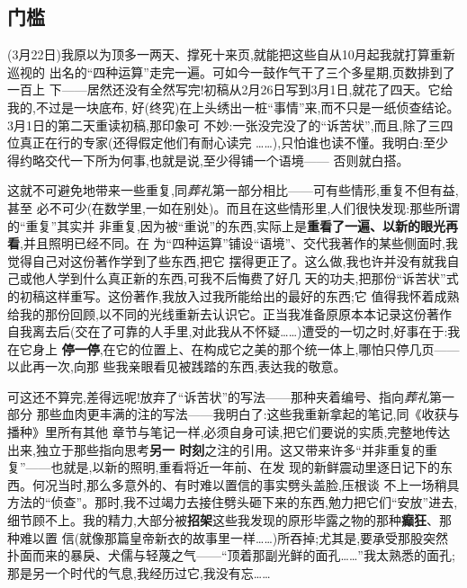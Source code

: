 \subsection{门槛}   %


\pmark{}(3月22日)我原以为顶多一两天、撑死十来页,就能把这些自从10月起我就打算重新巡视的
出名的“四种运算”走完一遍。可如今一鼓作气干了三个多星期,页数排到了一百上
下——居然还没有全然写完!初稿从2月26日写到3月1日,就花了四天。它给我的,不过是一块底布,
好(终究)在上头绣出一桩“事情”来,而不只是一纸侦查结论。3月1日的第二天重读初稿,那印象可
不妙:一张没完没了的“诉苦状”,而且,除了三四位真正在行的专家(还得假定他们有耐心读完
……),只怕谁也读不懂。我明白:至少得约略交代一下所为何事,也就是说,至少得铺一个语境——
否则就白搭。

这就不可避免地带来一些重复,同\emph{葬礼}第一部分相比——可有些情形,重复不但有益,甚至
必不可少(在数学里,一如在别处)。而且在这些情形里,人们很快发现:那些所谓的“重复”其实并
非重复,因为被“重说”的东西,实际上是\textbf{重看了一遍、以新的眼光再看},并且照明已经不同。在
为“四种运算”铺设“语境”、交代我著作的某些侧面时,我觉得自己对这份著作学到了些东西,把它
摆得更正了。这么做,我也许并没有就我自己或他人学到什么真正新的东西,可我不后悔费了好几
天的功夫,把那份“诉苦状”式的初稿这样重写。这份著作,我放入过我所能给出的最好的东西;它
值得我怀着成熟给我的那份回顾,以不同的光线重新去认识它。正当我准备原原本本记录这份著作
自我离去后(交在了可靠的人手里,对此我从不怀疑……)遭受的一切之时,好事在于:我在它身上
\textbf{停一停},在它的位置上、在构成它之美的那个统一体上,哪怕只停几页——以此再一次,向那
些我亲眼看见被践踏的东西,表达我的敬意。

\pmark{}可这还不算完,差得远呢!放弃了“诉苦状”的写法——那种夹着编号、指向\emph{葬礼}第一部分
那些血肉更丰满的注的写法——我明白了:这些我重新拿起的笔记,同《收获与播种》里所有其他
章节与笔记一样,必须自身可读,把它们要说的实质,完整地传达出来,独立于那些指向思考\textbf{另一
时刻}之注的引用。这又带来许多“并非重复的重复”——也就是,以新的照明,重看将近一年前、在发
现的新鲜震动里逐日记下的东西。何况当时,那么多意外的、有时难以置信的事实劈头盖脸,压根谈
不上一场稍具方法的“侦查”。那时,我不过竭力去接住劈头砸下来的东西,勉力把它们“安放”进去,
细节顾不上。我的精力,大部分被\textbf{招架}这些我发现的原形毕露之物的那种\textbf{癫狂}、那种难以置
信(就像那篇皇帝新衣的故事里一样……)所吞掉;尤其是,要承受那股突然扑面而来的暴戾、犬儒与轻蔑之气——“顶着那副光鲜的面孔……”我太熟悉的面孔;那是另一个时代的气息,我经历过它,我没有忘……

